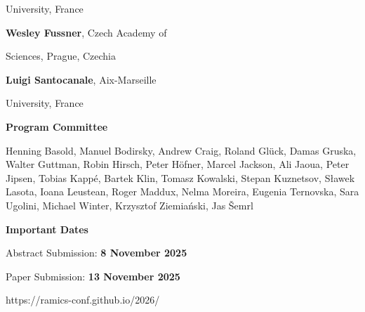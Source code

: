 \documentclass[a3paper, 12pt]{article}
\begin{document}
\begin{minipage}[t]{.43\linewidth}
  \hfill University, France

  \hfill \textbf{Wesley Fussner}, Czech Academy of

  \hfill Sciences, Prague, Czechia

  \hfill \textbf{Luigi Santocanale}, Aix-Marseille

  \hfill University, France

  \bigskip

  \hfill {\Large \bf Program Committee}

  \medskip

Henning Basold,
Manuel Bodirsky,
Andrew Craig,
Roland Glück,
Damas Gruska,
Walter Guttman,
Robin Hirsch,
Peter Höfner,
Marcel Jackson,
Ali Jaoua,
Peter Jipsen,
Tobias Kappé,
Bartek Klin,
Tomasz Kowalski,
Stepan Kuznetsov,
Sławek Lasota,
Ioana Leustean,
Roger Maddux,
Nelma Moreira,
Eugenia Ternovska,
Sara Ugolini,
Michael Winter,
Krzysztof Ziemiański,
Jas Šemrl
  
  \bigskip
  
  \hfill
  {\Large \bf Important Dates}

  \smallskip

  \hfill Abstract Submission: \textbf{8 November 2025}
  
  \hfill Paper Submission: \textbf{13 November 2025}
  


  \vspace{4ex}

  \hspace*{-15ex} {\fontsize{30}{40}\selectfont https://ramics-conf.github.io/2026/}

  \vspace*{-2ex}

\end{minipage}
\end{document}
